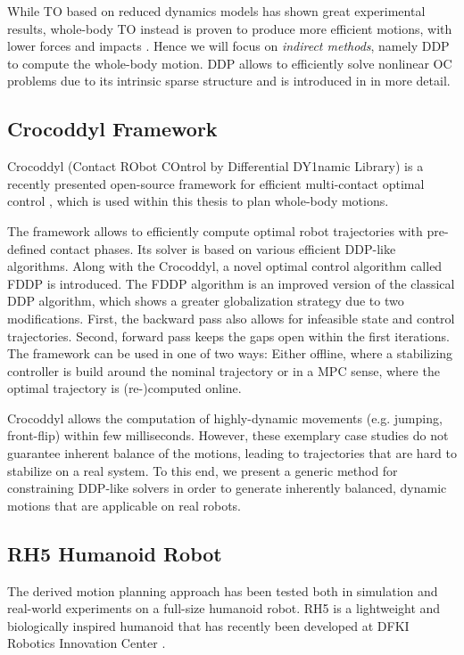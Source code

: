 While \gls{TO} based on reduced dynamics models has shown great experimental results, whole-body \gls{TO} instead is proven to produce more efficient motions, with lower forces and impacts \cite{budhiraja2018differential}. Hence we will focus on \textit{indirect methods}, namely \gls{DDP} to compute the whole-body motion. \gls{DDP} allows to efficiently solve nonlinear \gls{OC} problems due to its intrinsic sparse structure and is introduced in  in more detail.

\subsection{Crocoddyl Framework} 
Crocoddyl (Contact RObot COntrol by Differential DY1namic Library) is a recently presented open-source framework for efficient multi-contact optimal control \cite{mastalli20crocoddyl}, which is used within this thesis to plan whole-body motions. 

The framework allows to efficiently compute optimal robot trajectories with pre-defined contact phases. Its solver is based on various efficient \gls{DDP}-like algorithms. Along with the Crocoddyl, a novel optimal control algorithm called \gls{FDDP} is introduced. The \gls{FDDP} algorithm is an improved version of the classical \gls{DDP} algorithm, which shows a greater globalization strategy due to two modifications. First, the backward pass also allows for infeasible state and control trajectories. Second, forward pass keeps the gaps open within the first iterations. 
The framework can be used in one of two ways: Either offline, where a stabilizing controller is build around the nominal trajectory \cite{giraud2020motion} or in a \gls{MPC} sense, where the optimal trajectory is (re-)computed online. 

Crocoddyl allows the computation of highly-dynamic movements (e.g. jumping, front-flip) within few milliseconds. However, these exemplary case studies do not guarantee inherent balance of the motions, leading to trajectories that are hard to stabilize on a real system. To this end, we present a generic method for constraining DDP-like solvers in order to generate inherently balanced, dynamic motions that are applicable on real robots.    

\subsection{RH5 Humanoid Robot}
The derived motion planning approach has been tested both in simulation and real-world experiments on a full-size humanoid robot. RH5 is a lightweight and biologically inspired humanoid that has recently been developed at DFKI Robotics Innovation Center \cite{peters2017konstruktion}.

